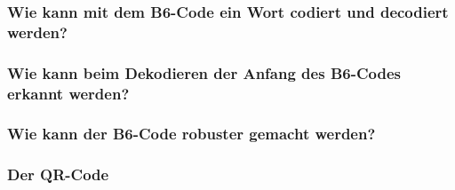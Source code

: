 \documentclass{beamer}
\begin{document}
\begin{frame}[t]
\begin{columns}
\begin{column}{0.3\textwidth}
		\end{column}

	\end{columns}
\end{frame}

\begin{frame}
	\frametitle{ Wie kann mit dem B6-Code ein Wort codiert und decodiert werden?}
\end{frame}

\begin{frame}
	\frametitle{ Wie kann beim Dekodieren der Anfang des B6-Codes erkannt werden?}
\end{frame}

\begin{frame}
	\frametitle{ Wie kann der B6-Code robuster gemacht werden?}
\end{frame}

\begin{frame}
	\frametitle{Der QR-Code}
	\begin{center}
	\end{center}
\end{frame}
\end{document}
